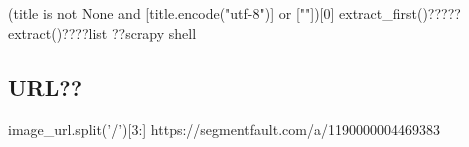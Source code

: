 \chapter{}
(title is not None and [title.encode("utf-8")] or [""])[0]
extract_first()?????
extract()????list
??scrapy shell
\section{URL??}
image_url.split('/')[3:]
https://segmentfault.com/a/1190000004469383